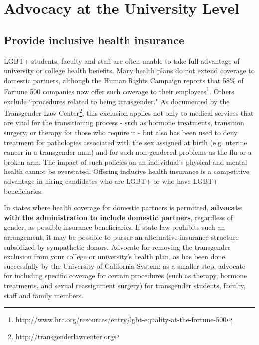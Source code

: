 %

\chapter{Advocacy at the University Level}	%
\label{univ-advocacy}		%
\normalsize			%

\section {Provide inclusive health insurance}
\label{health-insurance}
LGBT+ students, faculty and staff are often unable to take full advantage of university or college health benefits. Many health plans do not extend coverage to domestic partners, although the Human Rights Campaign reports that 58\% of Fortune 500 companies now offer such coverage to their employees\footnote{\href{http://www.hrc.org/resources/entry/lgbt-equality-at-the-fortune-500}{http://www.hrc.org/resources/entry/lgbt-equality-at-the-fortune-500}}. Others exclude ``procedures related to being transgender." As documented by the Transgender Law Center\footnote{\href{http://transgenderlawcenter.org}{http://transgenderlawcenter.org}}, this exclusion applies not only to medical services that are vital for the transitioning process - such as hormone treatments, transition surgery, or therapy for those who require it - but also has been used to deny treatment for pathologies associated with the sex assigned at birth (e.g. uterine cancer in a transgender man) and for such non-gendered problems as the flu or a broken arm. The impact of such policies on an individual's physical and mental health cannot be overstated. Offering inclusive health insurance is a competitive advantage in hiring candidates who are LGBT+ or who have LGBT+ beneficiaries.

In states where health coverage for domestic partners is permitted, \textbf{advocate with the administration to include domestic partners}, regardless of gender, as possible insurance beneficiaries. If state law prohibits such an arrangement, it may be possible to pursue an alternative insurance structure subsidized by sympathetic donors. Advocate for removing the transgender exclusion from your college or university's health plan, as has been done successfully by the University of California System; as a smaller step, advocate for including specific coverage for certain procedures (such as therapy, hormone treatments, and sexual reassignment surgery) for transgender students, faculty, staff and family members.

